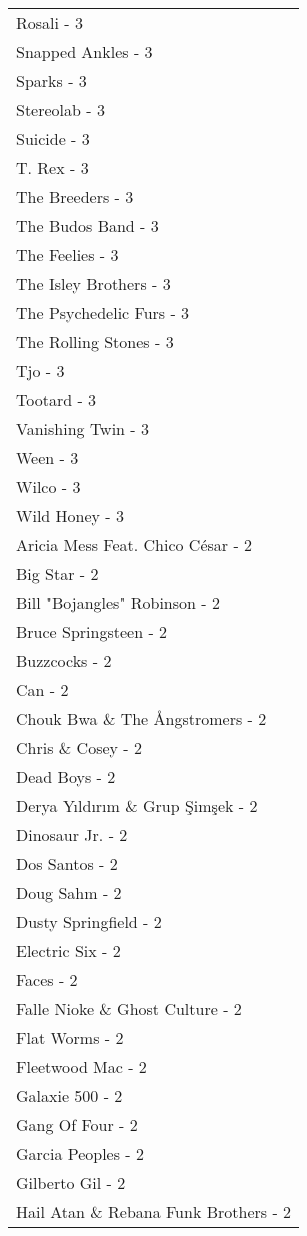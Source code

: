 \documentclass[
]{article}
\begin{document}
\begin{longtable}{l}
Rosali - 3 \\ 
Snapped Ankles - 3 \\ 
Sparks - 3 \\ 
Stereolab - 3 \\ 
Suicide - 3 \\ 
T. Rex - 3 \\ 
The Breeders - 3 \\ 
The Budos Band - 3 \\ 
The Feelies - 3 \\ 
The Isley Brothers - 3 \\ 
The Psychedelic Furs - 3 \\ 
The Rolling Stones - 3 \\ 
Tjo - 3 \\ 
Tootard - 3 \\ 
Vanishing Twin - 3 \\ 
Ween - 3 \\ 
Wilco - 3 \\ 
Wild Honey - 3 \\ 
Aricia Mess Feat. Chico César - 2 \\ 
Big Star - 2 \\ 
Bill "Bojangles" Robinson - 2 \\ 
Bruce Springsteen - 2 \\ 
Buzzcocks - 2 \\ 
Can - 2 \\ 
Chouk Bwa \& The Ångstromers - 2 \\ 
Chris \& Cosey - 2 \\ 
Dead Boys - 2 \\ 
Derya Yıldırım \& Grup Şimşek - 2 \\ 
Dinosaur Jr. - 2 \\ 
Dos Santos - 2 \\ 
Doug Sahm - 2 \\ 
Dusty Springfield - 2 \\ 
Electric Six - 2 \\ 
Faces - 2 \\ 
Falle Nioke \& Ghost Culture - 2 \\ 
Flat Worms - 2 \\ 
Fleetwood Mac - 2 \\ 
Galaxie 500 - 2 \\ 
Gang Of Four - 2 \\ 
Garcia Peoples - 2 \\ 
Gilberto Gil - 2 \\ 
Hail Atan \& Rebana Funk Brothers - 2 \\ 

\end{longtable}
\end{document}
